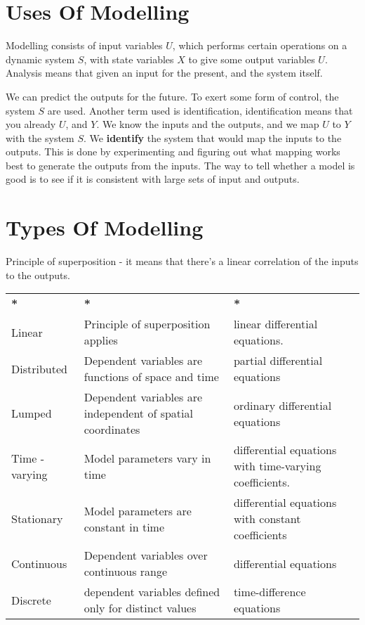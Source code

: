 \documentclass[11pt]{report}
\begin{document}
\section{Uses Of Modelling}
\label{sec:orge40deb1}
Modelling consists of input variables \(U\), which performs certain operations on a dynamic system \(S\), with state variables \(X\) to give some output variables \(U\).
Analysis means that given an input for the present, and the system itself.

We can predict the outputs for the future. To exert some form of control, the system \(S\) are used. Another term used is identification, identification means that you already \(U\), and \(Y\). We know the inputs and the outputs, and we map \(U\) to \(Y\) with the system \(S\). We \textbf{identify} the system that would map the inputs to the outputs. This is done by experimenting and figuring out what mapping works best to generate the outputs from the inputs. The way to tell whether a model is good is to see if it is consistent with large sets of input and outputs.
\section{Types Of Modelling}
\label{sec:orgeb2f0cb}
Principle of superposition - it means that there's a linear correlation of the inputs to the outputs.
\begin{center}
\begin{tabular}{lll}
\textbf{*} & \textbf{*} & \textbf{*}\\
Linear & Principle of superposition applies & linear differential equations.\\
Distributed & Dependent variables are functions of space and time & partial differential equations\\
Lumped & Dependent variables are independent of spatial coordinates & ordinary differential equations\\
Time - varying & Model parameters vary in time & differential equations with time-varying coefficients.\\
Stationary & Model parameters are constant in time & differential equations with constant coefficients\\
Continuous & Dependent variables over continuous range & differential equations\\
Discrete & dependent variables defined only for distinct values & time-difference equations\\
\end{tabular}
\end{center}
\end{document}
